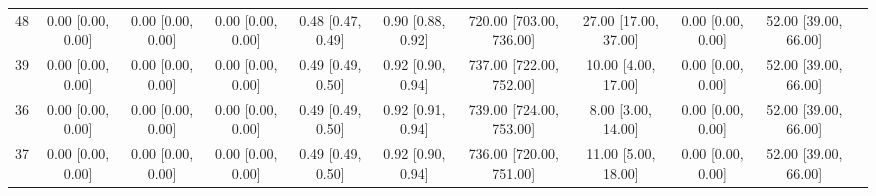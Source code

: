 \documentclass[8pt]{article}
\begin{document}
\begin{center}
\begin{footnotesize}
\begin{longtable}{|ccccccccccc|}
 48 &  0.00 [0.00, 0.00] &  0.00 [0.00, 0.00] &  0.00 [0.00, 0.00] &  0.48 [0.47, 0.49] &  0.90 [0.88, 0.92] &  720.00 [703.00, 736.00] &     27.00 [17.00, 37.00] &     0.00 [0.00, 0.00] &  52.00 [39.00, 66.00] \\
 39 &  0.00 [0.00, 0.00] &  0.00 [0.00, 0.00] &  0.00 [0.00, 0.00] &  0.49 [0.49, 0.50] &  0.92 [0.90, 0.94] &  737.00 [722.00, 752.00] &      10.00 [4.00, 17.00] &     0.00 [0.00, 0.00] &  52.00 [39.00, 66.00] \\
 36 &  0.00 [0.00, 0.00] &  0.00 [0.00, 0.00] &  0.00 [0.00, 0.00] &  0.49 [0.49, 0.50] &  0.92 [0.91, 0.94] &  739.00 [724.00, 753.00] &       8.00 [3.00, 14.00] &     0.00 [0.00, 0.00] &  52.00 [39.00, 66.00] \\
 37 &  0.00 [0.00, 0.00] &  0.00 [0.00, 0.00] &  0.00 [0.00, 0.00] &  0.49 [0.49, 0.50] &  0.92 [0.90, 0.94] &  736.00 [720.00, 751.00] &      11.00 [5.00, 18.00] &     0.00 [0.00, 0.00] &  52.00 [39.00, 66.00] \\
\end{longtable}
\end{footnotesize}
\end{center}
\end{document}
